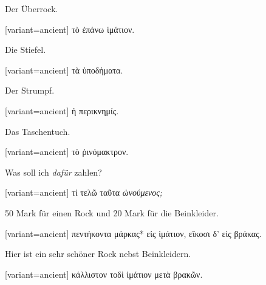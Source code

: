 Der Überrock. 

\switchcolumn

\begin{greek}[variant=ancient]%
τὸ ἐπάνω ἱμάτιον.

\end{greek}%
\switchcolumn*

Die Stiefel. 

\switchcolumn

\begin{greek}[variant=ancient]%
τὰ ὑποδήματα.

\end{greek}%
\switchcolumn*

Der Strumpf. 

\switchcolumn

\begin{greek}[variant=ancient]%
ἡ περικνημίς.

\end{greek}%
\switchcolumn*

Das Taschentuch. 

\switchcolumn

\begin{greek}[variant=ancient]%
τὸ ῥινόμακτρον.

\end{greek}%
\switchcolumn*

Was soll ich \emph{dafür} zahlen? 

\switchcolumn

\begin{greek}[variant=ancient]%
τί τελῶ ταῦτα \emph{ὠνούμενος;}

\end{greek}%
\switchcolumn*

50 Mark für einen Rock und 20 Mark für die Beinkleider. 

\switchcolumn

\begin{greek}[variant=ancient]%
πεντήκοντα μάρκας{*} εἰς ἱμάτιον, εἴκοσι δ' εἰς βράκας.

\end{greek}%
\switchcolumn*

Hier ist ein sehr schöner Rock nebst Beinkleidern. 

\switchcolumn

\begin{greek}[variant=ancient]%
κάλλιστον τοδὶ ἱμάτιον μετὰ βρακῶν.

\end{greek}%
\switchcolumn*

